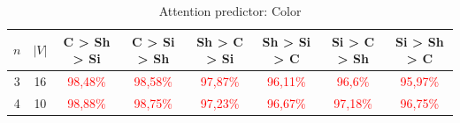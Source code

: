 \begin{table}[ht]
    \centering
    \begin{tabular}{cc|c|c|c|c|c|c}
        \toprule
        $n$ & $|V|$ & \textbf{C > Sh > Si}     & \textbf{C > Si > Sh}     & \textbf{Sh > C > Si}     & \textbf{Sh > Si > C}     & \textbf{Si > C > Sh}     & \textbf{Si > Sh > C}     \\\midrule
        {3} & {16}  & \textcolor{red}{98,48\%} & \textcolor{red}{98,58\%} & \textcolor{red}{97,87\%} & \textcolor{red}{96,11\%} & \textcolor{red}{96,6\%}  & \textcolor{red}{95,97\%} \\
        {4} & {10}  & \textcolor{red}{98,88\%} & \textcolor{red}{98,75\%} & \textcolor{red}{97,23\%} & \textcolor{red}{96,67\%} & \textcolor{red}{97,18\%} & \textcolor{red}{96,75\%} \\
        \bottomrule
    \end{tabular}
    \caption{Attention predictor: Color}
    \label{tab:probing:attention-predictor:colour}
\end{table}

